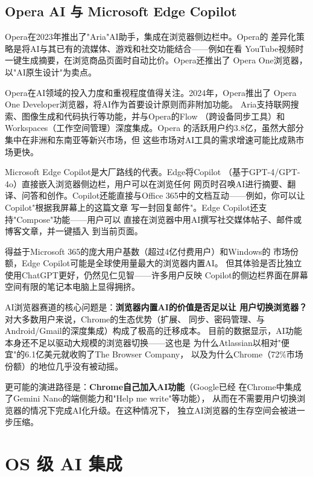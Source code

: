 \subsection{Opera AI 与 Microsoft Edge Copilot}
\label{subsec:opera-edge}

Opera在2023年推出了"Aria"AI助手，集成在浏览器侧边栏中。Opera的
差异化策略是将AI与其已有的流媒体、游戏和社交功能结合——例如在看
YouTube视频时一键生成摘要，在浏览商品页面时自动比价。Opera还推出了
Opera One浏览器，以"AI原生设计"为卖点。

Opera在AI领域的投入力度和重视程度值得关注。2024年，Opera推出了
Opera One Developer浏览器，将AI作为首要设计原则而非附加功能。
Aria支持联网搜索、图像生成和代码执行等功能，并与Opera的Flow
（跨设备同步工具）和Workspaces（工作空间管理）深度集成。Opera
的活跃用户约3.8亿，虽然大部分集中在非洲和东南亚等新兴市场，但
这些市场对AI工具的需求增速可能比成熟市场更快。

Microsoft Edge Copilot是大厂路线的代表。Edge将Copilot
（基于GPT-4/GPT-4o）直接嵌入浏览器侧边栏，用户可以在浏览任何
网页时召唤AI进行摘要、翻译、问答和创作。Copilot还能直接与Office
365中的文档互动——例如，你可以让Copilot"根据我屏幕上的这篇文章
写一封回复邮件"。Edge Copilot还支持"Compose"功能——用户可以
直接在浏览器中用AI撰写社交媒体帖子、邮件或博客文章，并一键插入
到当前页面。

得益于Microsoft 365的庞大用户基数（超过4亿付费用户）和Windows的
市场份额，Edge Copilot可能是全球使用量最大的浏览器内置AI。
但其体验是否比独立使用ChatGPT更好，仍然见仁见智——许多用户反映
Copilot的侧边栏界面在屏幕空间有限的笔记本电脑上显得拥挤。

AI浏览器赛道的核心问题是：\textbf{浏览器内置AI的价值是否足以让
用户切换浏览器？}对大多数用户来说，Chrome的生态优势（扩展、
同步、密码管理、与Android/Gmail的深度集成）构成了极高的迁移成本。
目前的数据显示，AI功能本身还不足以驱动大规模的浏览器切换——这也是
为什么Atlassian以相对"便宜"的6.1亿美元就收购了The Browser Company，
以及为什么Chrome（72\%市场份额）的地位几乎没有被动摇。

更可能的演进路径是：\textbf{Chrome自己加入AI功能}（Google已经
在Chrome中集成了Gemini Nano的端侧能力和"Help me write"等功能），
从而在不需要用户切换浏览器的情况下完成AI化升级。在这种情况下，
独立AI浏览器的生存空间会被进一步压缩。


\section{OS 级 AI 集成}
\label{sec:social-os}

